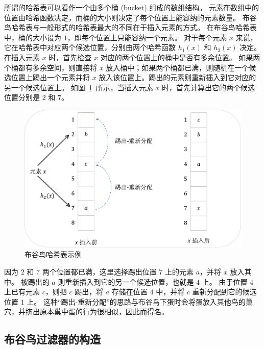 所谓的哈希表可以看作一个由多个桶 (bucket) 组成的数组结构。
元素在数组中的位置由哈希函数决定，而桶的大小则决定了每个位置上能容纳的元素数量。
布谷鸟哈希表与一般形式的哈希表最大的不同在于插入元素的方式。
在布谷鸟哈希表中，桶的大小设为 $1$，即每个位置上只能容纳一个元素。
对于每个元素 $x$ 来说，它在哈希表中对应两个候选位置，分别由两个哈希函数 $h_1(x)$ 和 $h_2(x)$ 决定。
在插入元素 $x$ 时，首先检查 $x$ 对应的两个位置上的桶中是否有多余位置。
如果两个桶都有多余空间，则直接将 $x$ 放入桶中；如果两个桶都已满，则随机在一个候选位置上踢出一个元素并将 $x$ 放入该位置上。踢出的元素则重新插入到它对应的另一个候选位置上。
如图~\ref{fig:cuckoo_example}~所示，当插入元素 $x$ 时，首先计算出它的两个候选位置分别是 $2$ 和 $7$。
\begin{figure}[ht]
  \centering
  \includegraphics[width=\textwidth]{figures/ckh_exp.pdf}
  \caption{布谷鸟哈希表示例}
  \label{fig:cuckoo_example}
\end{figure}
因为 $2$ 和 $7$ 两个位置都已满，这里选择踢出位置 $7$ 上的元素 $a$，并将 $x$ 放入其中。
被踢出的 $a$ 则重新插入到它的另一个候选位置，也就是 $4$ 上。
由于位置 $4$ 上已有元素 $c$，则把 $c$ 踢出，将 $a$ 存储在位置 $4$ 中，并将 $c$ 重新分配到它的候选位置 $1$ 上。
这种``踢出-重新分配''的思路与布谷鸟下蛋时会将蛋放入其他鸟的巢穴，并挤出原本巢中蛋的行为很相似，因此而得名。

\subsection{布谷鸟过滤器的构造}

